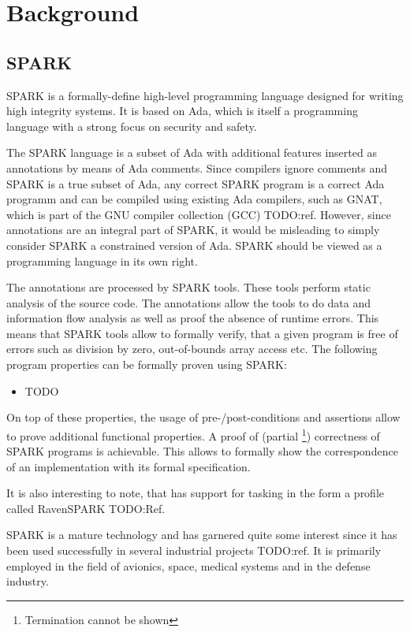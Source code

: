 \chapter{Background}
\section{SPARK}
SPARK is a formally-define high-level programming language designed for writing
high integrity systems. It is based on Ada, which is itself a programming
language with a strong focus on security and safety.

The SPARK language is a subset of Ada with additional features inserted as
annotations by means of Ada comments. Since compilers ignore comments and SPARK
is a true subset of Ada, any correct SPARK program is a correct Ada programm and
can be compiled using existing Ada compilers, such as GNAT, which is part of the
GNU compiler collection (GCC) TODO:ref. However, since annotations are an
integral part of SPARK, it would be misleading to simply consider SPARK a
constrained version of Ada. SPARK should be viewed as a programming language in
its own right.

The annotations are processed by SPARK tools. These tools perform static
analysis of the source code. The annotations allow the tools to do data and
information flow analysis as well as proof the absence of runtime errors. This
means that SPARK tools allow to formally verify, that a given program is free
of errors such as division by zero, out-of-bounds array access etc. The
following program properties can be formally proven using SPARK:

\begin{itemize}
	\item TODO
\end{itemize}

On top of these properties, the usage of pre-/post-conditions and assertions
allow to prove additional functional properties. A proof of (partial
\footnote{Termination cannot be shown}) correctness of SPARK programs is
achievable. This allows to formally show the correspondence of an implementation
with its formal specification.

It is also interesting to note, that has support for tasking in the form a
profile called RavenSPARK TODO:Ref.

SPARK is a mature technology and has garnered quite some interest since it has
been used successfully in several industrial projects TODO:ref. It is primarily
employed in the field of avionics, space, medical systems and in the defense
industry.

